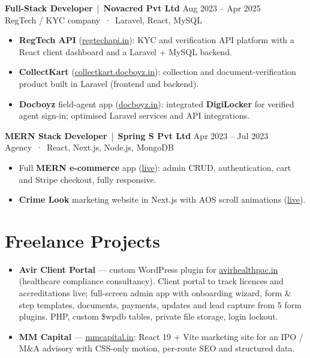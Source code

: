 \documentclass[10pt,a4paper]{article}
\newcommand{\link}[2]{\href{#1}{\color{teal}#2}}
\newcommand{\job}[4]{%
  \textbf{\large #1} \,|\, \textbf{\color{teal}#2} \hfill {\small\color{muted}#3}\\[-1pt]
  {\small\color{muted}#4}\vspace{1pt}}
\begin{document}
\job{Full-Stack Developer}{Novacred Pvt Ltd}{Aug 2023 -- Apr 2025}{RegTech / KYC company \,·\, Laravel, React, MySQL}
\begin{itemize}
  \item \textbf{RegTech API} (\link{https://regtechapi.in}{regtechapi.in}): KYC and verification API platform with a React client dashboard and a Laravel + MySQL backend.
  \item \textbf{CollectKart} (\link{https://collectkart.docboyz.in}{collectkart.docboyz.in}): collection and document-verification product built in Laravel (frontend and backend).
  \item \textbf{Docboyz} field-agent app (\link{https://docboyz.in}{docboyz.in}): integrated \textbf{DigiLocker} for verified agent sign-in; optimised Laravel services and API integrations.
\end{itemize}

\job{MERN Stack Developer}{Spring S Pvt Ltd}{Apr 2023 -- Jul 2023}{Agency \,·\, React, Next.js, Node.js, MongoDB}
\begin{itemize}
  \item Full \textbf{MERN e-commerce} app (\link{https://test-final-afte.onrender.com/}{live}): admin CRUD, authentication, cart and Stripe checkout, fully responsive.
  \item \textbf{Crime Look} marketing website in Next.js with AOS scroll animations (\link{https://crimelookwithnextjs.vercel.app/}{live}).
\end{itemize}

\section{Freelance Projects}
\begin{itemize}
  \item \textbf{Avir Client Portal} --- custom WordPress plugin for \link{https://avirhealthpac.in}{avirhealthpac.in} (healthcare compliance consultancy).
        Client portal to track licences and accreditations live; full-screen admin app with onboarding wizard, form \& step templates, documents,
        payments, updates and lead capture from 5 form plugins. PHP, custom \$wpdb tables, private file storage, login lockout.
  \item \textbf{MM Capital} --- \link{https://mmcapital.in}{mmcapital.in}: React 19 + Vite marketing site for an IPO / M\&A advisory with CSS-only motion,
        per-route SEO and structured data.
\end{itemize}
\end{document}
